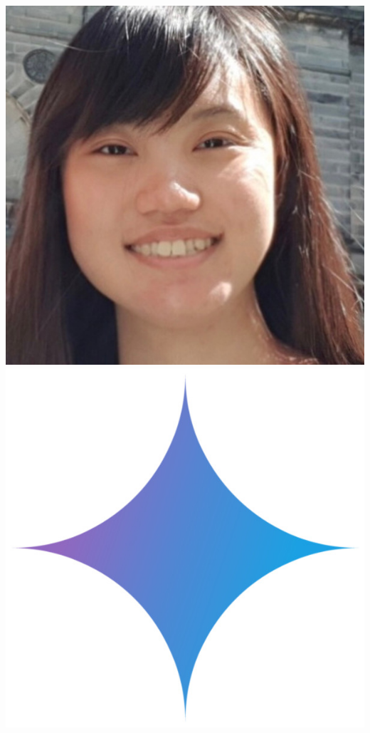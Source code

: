 \documentclass[aspectratio=169]{beamer}
\begin{document}
\begin{frame}
{        \includegraphics[width=0.06\textheight]{people/dily_ong.jpg}%
        \includegraphics[width=0.06\textheight]{people/gemini.jpg}%
}
\end{frame}
\end{document}
